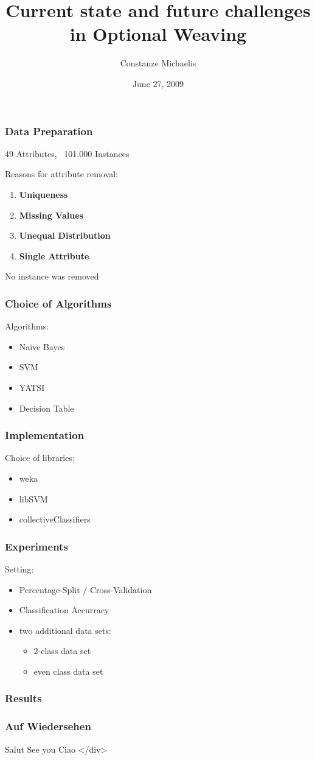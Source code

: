 \documentclass{beamer}
\title{Current state and future challenges in Optional Weaving}
\author{Constanze Michaelis}
\date{June 27, 2009}
\institute{Student Conference on Software Engineering and Database Systems}
\begin{document}
\begin{frame}[plain]
 \titlepage
\end{frame}

\begin{frame}
\frametitle{Data Preparation}

49 Attributes, ~101.000 Instances

Reasons for attribute removal:
\begin{enumerate}
\item \textbf{Uniqueness}

\item \textbf{Missing Values}

\item \textbf{Unequal Distribution}

\item \textbf{Single Attribute}
\end{enumerate}
No instance was removed
\end{frame}


\begin{frame}
\frametitle{Choice of Algorithms}
Algorithms:
\begin{itemize}
 \item Naive Bayes
 \item SVM
 \item YATSI
 \item Decision Table
\end{itemize}
\end{frame}

\begin{frame}
\frametitle{Implementation}
Choice of libraries:
\begin{itemize}
 \item weka
 \item libSVM
 \item collectiveClassifiers
\end{itemize}
\end{frame}

\begin{frame}
\frametitle{Experiments}
Setting:
\begin{itemize}
 \item Percentage-Split / Cross-Validation
 \item Classification Accurracy
 \item two additional data sets:
 \begin{itemize}
 	\item 2-class data set
 	\item even class data set
 \end{itemize}
\end{itemize}
\end{frame}

\begin{frame}
\frametitle{Results}
	
\end{frame}

\begin{frame}
\frametitle{Auf Wiedersehen}
Salut
See you
Ciao
</div>
	
\end{frame}
\end{document}
